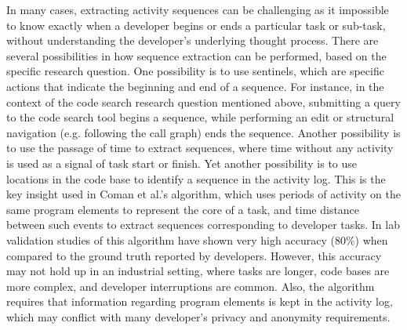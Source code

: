 In many cases, extracting activity sequences can be challenging as it impossible to know exactly when a developer begins or ends a particular task or sub-task, without understanding the developer's underlying thought process. There are several possibilities in how sequence extraction can be performed, based on the specific research question. One possibility is to use sentinels, which are specific actions that indicate the beginning and end of a sequence. For instance, in the context of the code search research question mentioned above, submitting a query to the code search tool begins a sequence, while performing an edit or structural navigation (e.g. following the call graph) ends the sequence. Another possibility is to use the passage of time to extract sequences, where time without any activity is used as a signal of task start or finish. Yet another possibility is to use locations in the code base to identify a sequence in the activity log. This is the key insight used in Coman et al.'s \cite{Coman-TaskIdent} algorithm, which uses periods of activity on the same program elements to represent the core of a task, and time distance between such events to extract sequences corresponding to developer tasks. In lab validation studies of this algorithm have shown very high accuracy (80\%) when compared to the ground truth reported by developers. However, this accuracy may not hold up in an industrial setting\cite{Zou-ComanIndustry}, where tasks are longer, code bases are more complex, and developer interruptions are common. Also, the algorithm requires that information regarding program elements is kept in the activity log, which may conflict with many developer's privacy and anonymity requirements.



